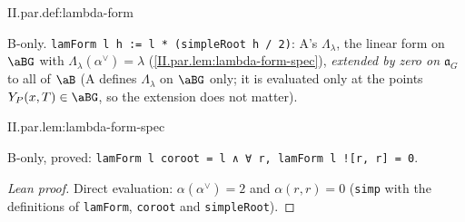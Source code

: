 \begin{definition}
\bonly
{}
\end{definition}
\begin{tfformal}{II.par.def:lambda-form}
\begin{tffidelity}
B-only. \texttt{lamForm l h := l * (simpleRoot h / 2)}: A's $\Lambda_\lambda$, the linear form on $\aBG$ with $\Lambda_\lambda(\alpha^\vee)=\lambda$ (\cref{II.par.lem:lambda-form-spec}), \emph{extended by zero on $\mathfrak a_G$} to all of $\aB$ (A defines $\Lambda_\lambda$ on $\aBG$ only; it is evaluated only at the points $Y_P(x,T)\in\aBG$, so the extension does not matter).
\end{tffidelity}
\end{tfformal}

\begin{lemma}
\bonly
{}
\end{lemma}
\begin{tfformal}{II.par.lem:lambda-form-spec}
\begin{tffidelity}
B-only, proved: \texttt{lamForm l coroot = l ∧ ∀ r, lamForm l ![r, r] = 0}.
\end{tffidelity}
\end{tfformal}
\begin{proof}[Lean proof]
Direct evaluation: $\alpha(\alpha^\vee)=2$ and $\alpha(r,r)=0$ (\texttt{simp} with the definitions of \texttt{lamForm}, \texttt{coroot} and \texttt{simpleRoot}).
\end{proof}

